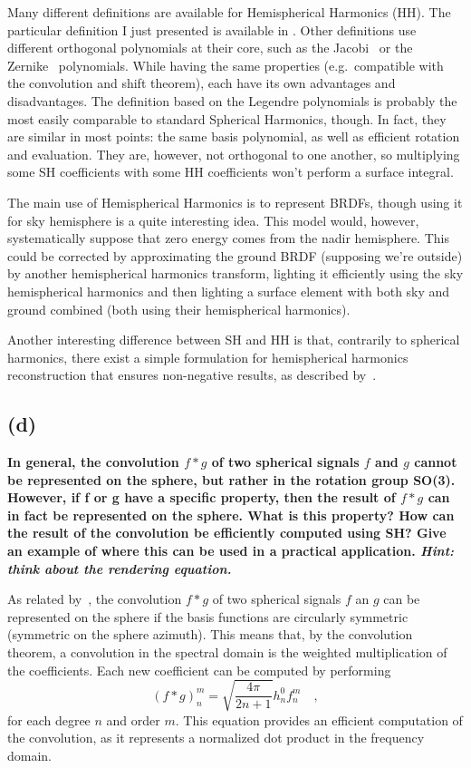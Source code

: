 \documentclass{report}
\begin{document}
Many different definitions are available for Hemispherical Harmonics (HH). The particular definition I just presented is available in \cite{Gautron2004}. Other definitions use different orthogonal polynomials at their core, such as the Jacobi~\cite{Makhotkin1996} or the Zernike~\cite{Koenderink1996} polynomials. While having the same properties (e.g.\ compatible with the convolution and shift theorem), each have its own advantages and disadvantages. The definition based on the Legendre polynomials is probably the most easily comparable to standard Spherical Harmonics, though. In fact, they are similar in most points: the same basis polynomial, as well as efficient rotation and evaluation. They are, however, not orthogonal to one another, so multiplying some SH coefficients with some HH coefficients won't perform a surface integral.

The main use of Hemispherical Harmonics is to represent BRDFs, though using it for sky hemisphere is a quite interesting idea. This model would, however, systematically suppose that zero energy comes from the nadir hemisphere. This could be corrected by approximating the ground BRDF (supposing we're outside) by another hemispherical harmonics transform, lighting it efficiently using the sky hemispherical harmonics and then lighting a surface element with both sky and ground combined (both using their hemispherical harmonics).

Another interesting difference between SH and HH is that, contrarily to spherical harmonics, there exist a simple formulation for hemispherical harmonics reconstruction that ensures non-negative results, as described by~\cite{Elhabian2011}.

\subsection{(d)}
\textbf{In general, the convolution $f * g$ of two spherical signals $f$ and $g$ cannot be represented on the sphere, but rather in the rotation group SO(3). However, if f or g have a specific property, then the result of $f * g$ can in fact be represented on the sphere. What is this property? How can the result of the convolution be efficiently computed using SH? Give an example of where this can be used in a practical application. \emph{Hint: think about the rendering equation.}}

As related by~\cite{Sloan2008,jarosz-08}, the convolution $f*g$ of two spherical signals $f$ an $g$ can be represented on the sphere if the basis functions are circularly symmetric (symmetric on the sphere azimuth). This means that, by the convolution theorem, a convolution in the spectral domain is the weighted multiplication of the coefficients. Each new coefficient can be computed by performing
\begin{equation}
\left(f * g\right)_n^m = \sqrt{\frac{4\pi}{2n+1}} h_n^0 f_n^m
\quad,
\end{equation}
for each degree $n$ and order $m$. This equation provides an efficient computation of the convolution, as it represents a normalized dot product in the frequency domain.
\end{document}
